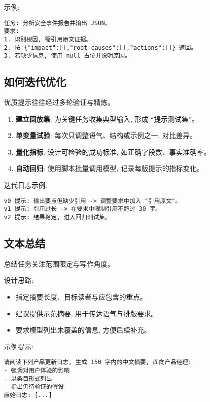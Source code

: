 ﻿\documentclass[12pt]{ctexart}
\begin{document}
示例:\par
\begin{verbatim}
任务: 分析安全事件报告并输出 JSON。
要求:
1. 识别根因, 需引用原文证据。
2. 按 {"impact":[],"root_causes":[],"actions":[]} 返回。
3. 若缺少信息, 使用 null 占位并说明原因。
\end{verbatim}

\subsection{如何迭代优化}
优质提示往往经过多轮验证与精炼。

\begin{enumerate}[leftmargin=*,itemsep=0.4em]
  \item \textbf{建立回放集}: 为关键任务收集典型输入, 形成 ``提示测试集''。
  \item \textbf{单变量试验}: 每次只调整语气、结构或示例之一, 对比差异。
  \item \textbf{量化指标}: 设计可检验的成功标准, 如正确字段数、事实准确率。
  \item \textbf{自动回归}: 使用脚本批量调用模型, 记录每版提示的指标变化。
\end{enumerate}

迭代日志示例:\par
\begin{verbatim}
v0 提示: 输出要点但缺少引用 -> 调整要求中加入 "引用原文"。
v1 提示: 引用过长 -> 在要求中限制引用不超过 30 字。
v2 提示: 结果稳定, 进入回归测试集。
\end{verbatim}

\subsection{文本总结}
总结任务关注范围限定与写作角度。

设计思路:
\begin{itemize}[leftmargin=*,itemsep=0.4em]
  \item 指定摘要长度、目标读者与应包含的重点。
  \item 建议提供示范摘要, 用于传达语气与排版要求。
  \item 要求模型列出未覆盖的信息, 方便后续补充。
\end{itemize}

示例提示:\par
\begin{verbatim}
请阅读下列产品更新日志, 生成 150 字内的中文摘要, 面向产品经理:
- 强调对用户体验的影响
- 以条目形式列出
- 指出仍待验证的假设
原始日志: [...]
\end{verbatim}
\end{document}

